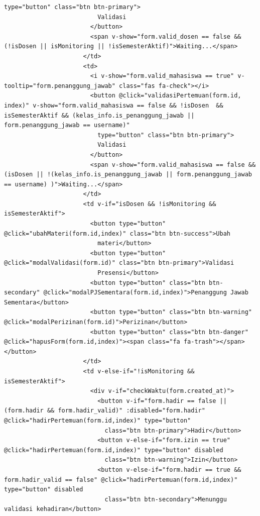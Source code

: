 \begin{lstlisting}[breaklines]
                          type="button" class="btn btn-primary">
                          Validasi
                        </button>
                        <span v-show="form.valid_dosen == false && (!isDosen || isMonitoring || !isSemesterAktif)">Waiting...</span>
                      </td>
                      <td>
                        <i v-show="form.valid_mahasiswa == true" v-tooltip="form.penanggung_jawab" class="fas fa-check"></i>
                        <button @click="validasiPertemuan(form.id, index)" v-show="form.valid_mahasiswa == false && !isDosen  && isSemesterAktif && (kelas_info.is_penanggung_jawab || form.penanggung_jawab == username)"
                          type="button" class="btn btn-primary">
                          Validasi
                        </button>
                        <span v-show="form.valid_mahasiswa == false && (isDosen || !(kelas_info.is_penanggung_jawab || form.penanggung_jawab == username) )">Waiting...</span>
                      </td>
                      <td v-if="isDosen && !isMonitoring && isSemesterAktif">
                        <button type="button" @click="ubahMateri(form.id,index)" class="btn btn-success">Ubah
                          materi</button>
                        <button type="button" @click="modalValidasi(form.id)" class="btn btn-primary">Validasi
                          Presensi</button>
                        <button type="button" class="btn btn-secondary" @click="modalPJSementara(form.id,index)">Penanggung Jawab Sementara</button>
                        <button type="button" class="btn btn-warning" @click="modalPerizinan(form.id)">Perizinan</button>
                        <button type="button" class="btn btn-danger" @click="hapusForm(form.id,index)"><span class="fa fa-trash"></span></button>
                      </td>
                      <td v-else-if="!isMonitoring && isSemesterAktif">
                        <div v-if="checkWaktu(form.created_at)">
                          <button v-if="form.hadir == false || (form.hadir && form.hadir_valid)" :disabled="form.hadir" @click="hadirPertemuan(form.id,index)" type="button"
                            class="btn btn-primary">Hadir</button>
                          <button v-else-if="form.izin == true" @click="hadirPertemuan(form.id,index)" type="button" disabled
                            class="btn btn-warning">Izin</button>
                          <button v-else-if="form.hadir == true && form.hadir_valid == false" @click="hadirPertemuan(form.id,index)" type="button" disabled
                            class="btn btn-secondary">Menunggu validasi kehadiran</button>

\end{lstlisting}
